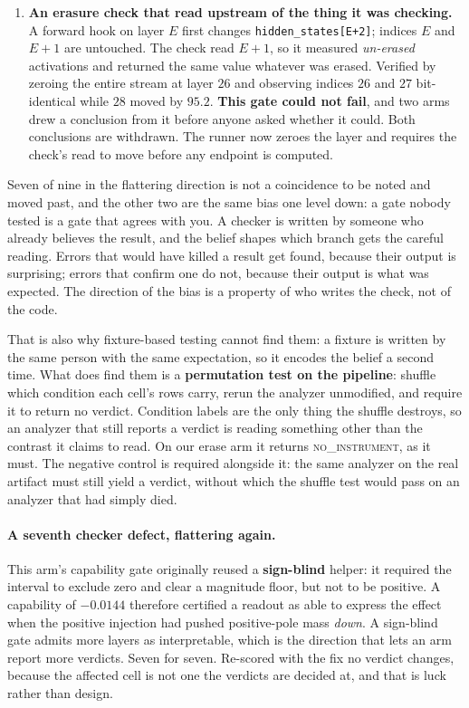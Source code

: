 \documentclass{article}
\begin{document}
\begin{enumerate}
records that as decodability. On synthetic data where the concept is genuinely erased, that protocol
reads $0.728$ where an honest train/held-out one reads $0.521$.
\item \textbf{An erasure check that read upstream of the thing it was checking.} A forward hook on
layer $E$ first changes \texttt{hidden\_states[E+2]}; indices $E$ and $E{+}1$ are untouched. The
check read $E{+}1$, so it measured \emph{un-erased} activations and returned the same value whatever
was erased. Verified by zeroing the entire stream at layer $26$ and observing indices $26$ and $27$
bit-identical while $28$ moved by $95.2$. \textbf{This gate could not fail}, and two arms drew a
conclusion from it before anyone asked whether it could. Both conclusions are withdrawn. The runner
now zeroes the layer and requires the check's read to move before any endpoint is computed.
\end{enumerate}

\noindent Seven of nine in the flattering direction is not a coincidence to be noted and moved past, and
the other two are the same bias one level down: a gate nobody tested is a gate that agrees
with you.
A checker is written by someone who already believes the result, and the belief shapes which branch
gets the careful reading. Errors that would have killed a result get found, because their output is
surprising; errors that confirm one do not, because their output is what was expected. The
direction of the bias is a property of who writes the check, not of the code.

That is also why fixture-based testing cannot find them: a fixture is written by the same person
with the same expectation, so it encodes the belief a second time. What does find them is a
\textbf{permutation test on the pipeline}: shuffle which condition each cell's rows carry, rerun the
analyzer unmodified, and require it to return no verdict. Condition labels are the only thing the
shuffle destroys, so an analyzer that still reports a verdict is reading something other than the
contrast it claims to read. On our erase arm it returns \textsc{no\_instrument}, as it must. The
negative control is required alongside it: the same analyzer on the real artifact must still yield
a verdict, without which the shuffle test would pass on an analyzer that had simply died.

\paragraph{A seventh checker defect, flattering again.} This arm's capability gate originally reused
a \textbf{sign-blind} helper: it required the interval to exclude zero and clear a magnitude floor,
but not to be positive. A capability of $-0.0144$ therefore certified a readout as able to express
the effect when the positive injection had pushed positive-pole mass \emph{down}. A sign-blind gate
admits more layers as interpretable, which is the direction that lets an arm report more verdicts.
Seven for seven. Re-scored with the fix no verdict changes, because the affected cell is not one the
verdicts are decided at, and that is luck rather than design.
\end{document}
